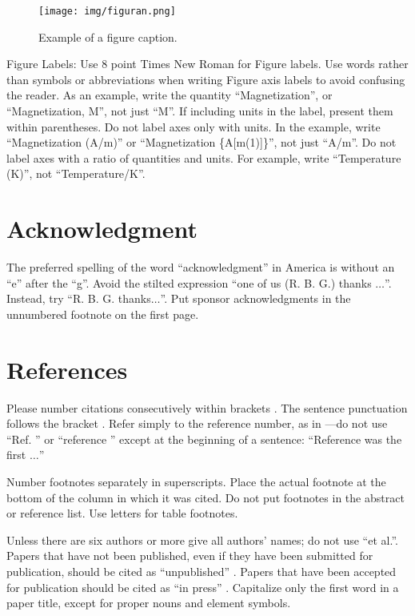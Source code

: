 \documentclass[conference]{IEEEtran}
\begin{document}
\begin{figure}[htbp]
\centerline{\texttt{[image: img/figuran.png]}}
\caption{Example of a figure caption.}
\label{fig}
\end{figure}

Figure Labels: Use 8 point Times New Roman for Figure labels. Use words 
rather than symbols or abbreviations when writing Figure axis labels to 
avoid confusing the reader. As an example, write the quantity 
``Magnetization'', or ``Magnetization, M'', not just ``M''. If including 
units in the label, present them within parentheses. Do not label axes only 
with units. In the example, write ``Magnetization (A/m)'' or ``Magnetization 
\{A[m(1)]\}'', not just ``A/m''. Do not label axes with a ratio of 
quantities and units. For example, write ``Temperature (K)'', not 
``Temperature/K''.

\section*{Acknowledgment}

The preferred spelling of the word ``acknowledgment'' in America is without 
an ``e'' after the ``g''. Avoid the stilted expression ``one of us (R. B. 
G.) thanks $\ldots$''. Instead, try ``R. B. G. thanks$\ldots$''. Put sponsor 
acknowledgments in the unnumbered footnote on the first page.

\section*{References}

Please number citations consecutively within brackets \cite{b1}. The 
sentence punctuation follows the bracket \cite{b2}. Refer simply to the reference 
number, as in \cite{b3}---do not use ``Ref. \cite{b3}'' or ``reference \cite{b3}'' except at 
the beginning of a sentence: ``Reference \cite{b3} was the first $\ldots$''

Number footnotes separately in superscripts. Place the actual footnote at 
the bottom of the column in which it was cited. Do not put footnotes in the 
abstract or reference list. Use letters for table footnotes.

Unless there are six authors or more give all authors' names; do not use 
``et al.''. Papers that have not been published, even if they have been 
submitted for publication, should be cited as ``unpublished'' \cite{b4}. Papers 
that have been accepted for publication should be cited as ``in press'' \cite{b5}. 
Capitalize only the first word in a paper title, except for proper nouns and 
element symbols.
\end{document}
